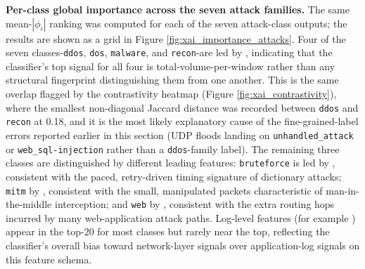 \textbf{Per-class global importance across the seven attack families.} The same mean-$|\phi_i|$ ranking was computed for each of the seven attack-class outputs; the results are shown as a grid in Figure \ref{fig:xai_importance_attacks}. Four of the seven classes-\texttt{ddos}, \texttt{dos}, \texttt{malware}, and \texttt{recon}-are led by , indicating that the classifier's top signal for all four is total-volume-per-window rather than any structural fingerprint distinguishing them from one another. This is the same overlap flagged by the contrastivity heatmap (Figure \ref{fig:xai_contrastivity}), where the smallest non-diagonal Jaccard distance was recorded between \texttt{ddos} and \texttt{recon} at 0.18, and it is the most likely explanatory cause of the fine-grained-label errors reported earlier in this section (UDP floods landing on \texttt{unhandled\_attack} or \texttt{web\_sql-injection} rather than a \texttt{ddos}-family label). The remaining three classes are distinguished by different leading features: \texttt{bruteforce} is led by , consistent with the paced, retry-driven timing signature of dictionary attacks; \texttt{mitm} by , consistent with the small, manipulated packets characteristic of man-in-the-middle interception; and \texttt{web} by , consistent with the extra routing hops incurred by many web-application attack paths. Log-level features (for example ) appear in the top-20 for most classes but rarely near the top, reflecting the classifier's overall bias toward network-layer signals over application-log signals on this feature schema.

